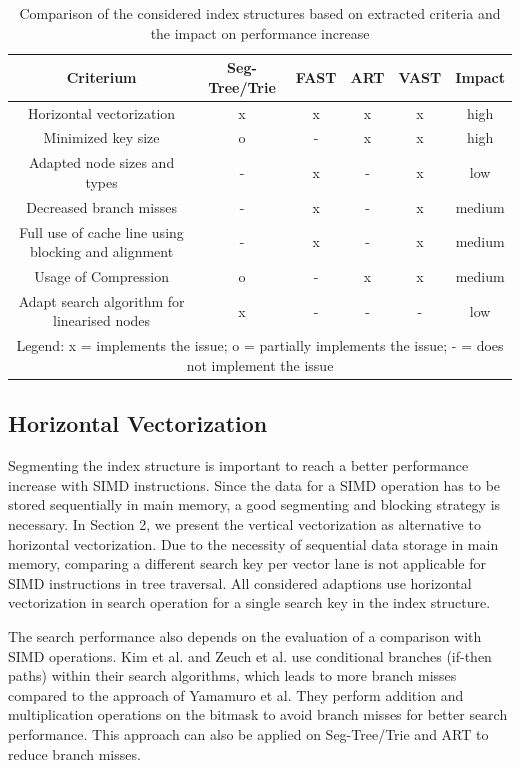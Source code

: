 \documentclass[runningheads,a4paper]{llncs}
\begin{document}
\begin{table}[htbp]
\footnotesize
	\caption{Comparison of the considered index structures based on extracted criteria and the impact on performance increase}
	\begin{center}
		\begin{tabular}{|c|c|c|c|c|c|}
			\hline
			\textbf{Criterium}&\textbf{Seg-Tree/Trie}&\textbf{FAST}&\textbf{ART}&\textbf{VAST}&\textbf{Impact}\\
			\hline
			Horizontal vectorization & x & x & x & x & high\\
			Minimized key size & o & - & x & x & high\\
			Adapted node sizes and types & - & x & - & x & low\\
			Decreased branch misses & - & x & - & x & medium\\
			Full use of cache line using blocking and alignment & - & x & - & x & medium\\
			Usage of Compression & o & - & x & x & medium\\
			Adapt search algorithm for linearised nodes & x & - & - & - & low\\
			\hline
			\multicolumn{6}{|c|}{Legend: x = implements the issue; o = partially implements the issue; - = does not implement the issue}\\
			\hline
		\end{tabular}
		\label{tasuaib2011architecture}
	\end{center}
\end{table}

\subsection{Horizontal Vectorization}
Segmenting the index structure is important to reach a better performance increase with SIMD instructions. Since the data for a SIMD operation has to be stored sequentially in main memory, a good segmenting and blocking strategy is necessary. In Section 2, we present the vertical vectorization as alternative to horizontal vectorization. Due to the necessity of sequential data storage in main memory, comparing a different search key per vector lane is not applicable for SIMD instructions in tree traversal. All considered adaptions use horizontal vectorization in search operation for a single search key in the index structure.

The search performance also depends on the evaluation of a comparison with SIMD operations. Kim et al. and Zeuch et al. use conditional branches (if-then paths) within their search algorithms, which leads to more branch misses compared to the approach of Yamamuro et al. They perform addition and multiplication operations on the bitmask to avoid branch misses for better search performance. This approach can also be applied on Seg-Tree/Trie and ART to reduce branch misses.
\end{document}
